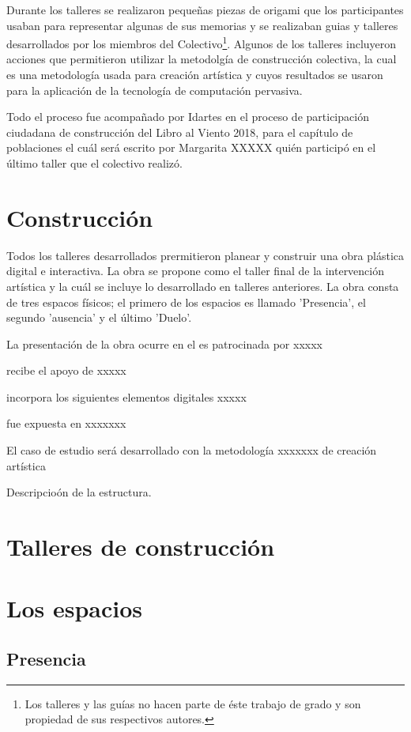 Durante los talleres se realizaron pequeñas piezas de origami que los participantes usaban para representar algunas de sus memorias y se realizaban guias y talleres desarrollados por los miembros del Colectivo\footnote{Los talleres y las guías no hacen parte de éste trabajo de grado y son propiedad de sus respectivos autores.}. Algunos de los talleres incluyeron acciones que permitieron utilizar la metodolgía de construcción colectiva, la cual es una metodología usada para creación artística y cuyos resultados se usaron para la aplicación de la tecnología de computación pervasiva.

Todo el proceso fue acompañado por Idartes en el proceso de participación ciudadana de construcción del Libro al Viento 2018, para el capítulo de poblaciones el cuál será escrito por Margarita XXXXX quién participó en el último taller que el colectivo realizó.

\section{Construcción}

Todos los talleres desarrollados prermitieron planear y construir una obra plástica digital e interactiva. La obra se propone como el taller final de la intervención artística y la cuál se incluye lo desarrollado en talleres anteriores. La obra consta de tres espacos físicos; el primero de los espacios es llamado 'Presencia', el segundo 'ausencia' y el último 'Duelo'.

La presentación de la obra ocurre en el es patrocinada por xxxxx

recibe el apoyo de xxxxx

incorpora los siguientes elementos digitales xxxxx

fue expuesta en xxxxxxx

El caso de estudio será desarrollado con la metodología xxxxxxx de creación artística

Descripcioón de la estructura.


\section{Talleres de construcción}


\section{Los espacios}


\subsection{Presencia}

